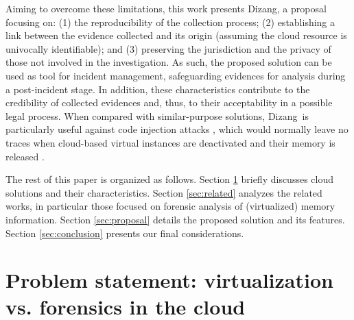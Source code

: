 \documentclass[conference]{IEEEtran}
\newcommand{\marcos}[1]{{\color{green}{MARCOS: #1}}}
\newcommand{\fancyname}{Dizang}
\begin{document}
%
Aiming to overcome these limitations, this work presents \fancyname, a proposal focusing on: (1) the reproducibility of the collection process; (2) establishing a link between the evidence collected and its origin (assuming the cloud resource is univocally identifiable); and (3) preserving the jurisdiction and the privacy of those not involved in the investigation.
%
As such, the proposed solution can be used as tool for incident management, safeguarding evidences for analysis during a post-incident stage.
%
In addition, these characteristics contribute to the credibility of collected evidences and, thus, to their acceptability in a possible legal process.
%
%
%
When compared with similar-purpose solutions, \fancyname\ is particularly useful against code injection attacks \cite{Case_Memory_Forensics:2014}, which would normally leave no traces when cloud-based virtual instances are deactivated and their memory is released \cite{Vomel_Memory_Acquisition:2013,Case_Memory_Forensics:2014}.


The rest of this paper is organized as follows.
%
Section \ref{sec:cloud} briefly discusses cloud solutions and their characteristics.
%
Section \ref{sec:related} analyzes the related works, in particular those focused on forensic analysis of (virtualized) memory information.
%
Section \ref{sec:proposal} details the proposed solution and its features.
%
Section \ref{sec:conclusion} presents our final considerations.



\section{Problem statement: virtualization vs. forensics in the cloud}
\label{sec:cloud}
\end{document}
